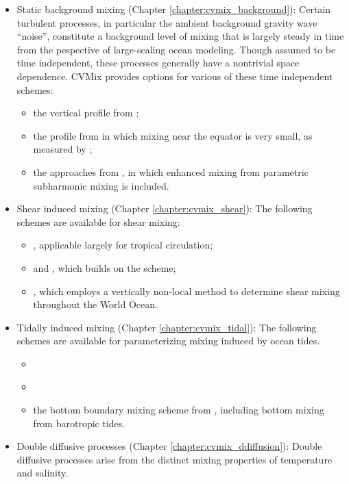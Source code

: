 \begin{itemize}

\item {\sc Static background mixing} (Chapter
  \ref{chapter:cvmix_background}): Certain turbulent processes, in
  particular the ambient background gravity wave ``noise'', constitute
  a background level of mixing that is largely steady in time from the
  pespective of large-scaling ocean modeling.  Though assumed to be
  time independent, these processes generally have a nontrivial space
  dependence.  CVMix provides options for various of these time
  independent schemes:
\begin{itemize}
\item the vertical profile from \cite{BryanLewis1979};
\item the profile from \cite{Henyey_etal1986} in which mixing near the
  equator is very small, as measured by \cite{Gregg_etal2003}; 
\item the approaches from \cite{Jochum2009}, in which enhanced mixing
  from parametric subharmonic mixing is included. 
\end{itemize}


\item {\sc Shear induced mixing} (Chapter \ref{chapter:cvmix_shear}):
  The following schemes are available for shear mixing:
 \begin{itemize}
 \item \cite{PPvmix}, applicable largely for tropical circulation;
 \item \cite{LargeKPP} and \cite{Large_Gent1999}, which builds on the
   \cite{PPvmix} scheme;
 \item \cite{Jacksonetal2008}, which employs a vertically non-local
   method to determine shear mixing throughout the World Ocean.
 \end{itemize}


\item {\sc Tidally induced mixing} (Chapter
  \ref{chapter:cvmix_tidal}): The following schemes are available for
  parameterizing mixing induced by ocean tides.
  \begin{itemize}
   \item \cite{Simmonsetal2004} 
   \item \cite{Melet_etal_2013}
   \item  the bottom boundary mixing scheme from \cite{Legg_eta2006},
     including bottom mixing from barotropic tides. 
\end{itemize}


\item {\sc Double diffusive processes} (Chapter
  \ref{chapter:cvmix_ddiffusion}): Double diffusive processes arise
  from the distinct mixing properties of temperature and
  salinity. 


\end{itemize}
